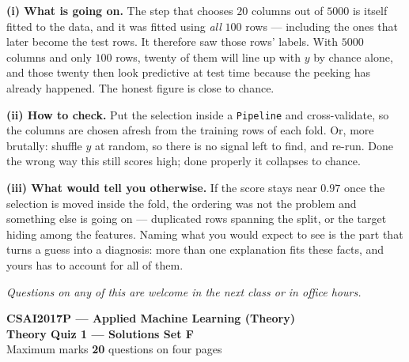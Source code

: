 \documentclass[10pt,a4paper]{article}
\newcommand{\SetLetter}{}
\begin{document}
\vspace{4pt}

\textbf{(i) What is going on.} The step that chooses $20$ columns out of $5000$ is itself fitted to the data, and it was fitted using \emph{all} $100$ rows --- including the ones that later become the test rows. It therefore saw those rows' labels. With $5000$ columns and only $100$ rows, twenty of them will line up with $y$ by chance alone, and those twenty then look predictive at test time because the peeking has already happened. The honest figure is close to chance.\par\vspace{1mm}\textbf{(ii) How to check.} Put the selection inside a \texttt{Pipeline} and cross-validate, so the columns are chosen afresh from the training rows of each fold. Or, more brutally: shuffle $y$ at random, so there is no signal left to find, and re-run. Done the wrong way this still scores high; done properly it collapses to chance.\par\vspace{1mm}\textbf{(iii) What would tell you otherwise.} If the score stays near $0.97$ once the selection is moved inside the fold, the ordering was not the problem and something else is going on --- duplicated rows spanning the split, or the target hiding among the features. Naming what you would expect to see is the part that turns a guess into a diagnosis: more than one explanation fits these facts, and yours has to account for all of them.

\vfill

{\footnotesize\itshape Questions on any of this are welcome in the next class or in office hours.}

\newpage


\renewcommand{\SetLetter}{F}\setcounter{page}{1}

\begin{center}
{\large\bfseries CSAI2017P --- Applied Machine Learning (Theory)}\\[2pt]
{\large\bfseries Theory Quiz 1 --- Solutions \quad\textbullet\quad Set F}\\[3pt]
{\small Maximum marks \textbf{20} \quad\textbullet{} questions on four pages}
\end{center}
\vspace{2pt}

\noindent{}
\vspace{3pt}
\end{document}

